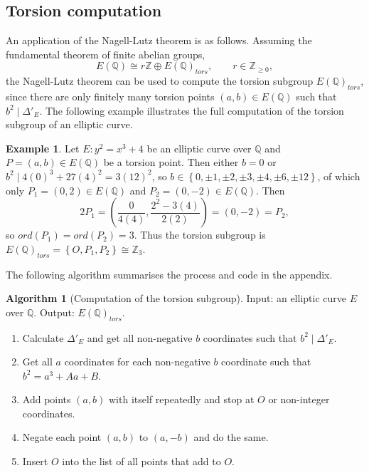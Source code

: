 \documentclass{article}
\newcommand{\Z}{\mathbb{Z}}
\newcommand{\Q}{\mathbb{Q}}
\newcommand{\rb}[1]{\left( #1 \right)}
\newcommand{\cb}[1]{\left\{ #1 \right\}}
\theoremstyle{definition}\newtheorem*{definition}{Definition}
\theoremstyle{definition}\newtheorem*{example}{Example}
\theoremstyle{definition}\newtheorem*{remark}{Remark}
\newtheorem{algorithm}[proposition]{Algorithm}
\begin{document}
\subsection{Torsion computation}

An application of the Nagell-Lutz theorem is as follows. Assuming the fundamental theorem of finite abelian groups,
$$ E\rb{\Q} \cong r\Z \oplus E\rb{\Q}_{tors}, \qquad r \in \Z_{\ge 0}, $$
the Nagell-Lutz theorem can be used to compute the torsion subgroup $ E\rb{\Q}_{tors} $, since there are only finitely many torsion points $ \rb{a, b} \in E\rb{\Q} $ such that $ b^2 \mid \Delta'_E $. The following example illustrates the full computation of the torsion subgroup of an elliptic curve.

\begin{example}
Let $ E : y^2 = x^3 + 4 $ be an elliptic curve over $ \Q $ and $ P = \rb{a, b} \in E\rb{\Q} $ be a torsion point. Then either $ b = 0 $ or $ b^2 \mid 4\rb{0}^3 + 27\rb{4}^2 = 3\rb{12}^2 $, so $ b \in \cb{0, \pm 1, \pm 2, \pm 3, \pm 4, \pm 6, \pm 12} $, of which only $ P_1 = \rb{0, 2} \in E\rb{\Q} $ and $ P_2 = \rb{0, -2} \in E\rb{\Q} $. Then
$$ 2P_1 = \rb{\dfrac{0}{4\rb{4}}, \dfrac{2^2 - 3\rb{4}}{2\rb{2}}} = \rb{0, -2} = P_2, $$
so $ ord\rb{P_1} = ord\rb{P_2} = 3 $. Thus the torsion subgroup is $ E\rb{\Q}_{tors} = \cb{O, P_1, P_2} \cong \Z_3 $.
\end{example}

The following algorithm summarises the process and code in the appendix.

\begin{algorithm}[Computation of the torsion subgroup]
Input: an elliptic curve $ E $ over $ \Q $. Output: $ E\rb{\Q}_{tors} $.
\begin{enumerate}
\item Calculate $ \Delta'_E $ and get all non-negative $ b $ coordinates such that $ b^2 \mid \Delta'_E $.
\item Get all $ a $ coordinates for each non-negative $ b $ coordinate such that $ b^2 = a^3 + Aa + B $.
\item Add points $ \rb{a, b} $ with itself repeatedly and stop at $ O $ or non-integer coordinates.
\item Negate each point $ \rb{a, b} $ to $ \rb{a, -b} $ and do the same.
\item Insert $ O $ into the list of all points that add to $ O $.
\end{enumerate}
\end{algorithm}
\end{document}
